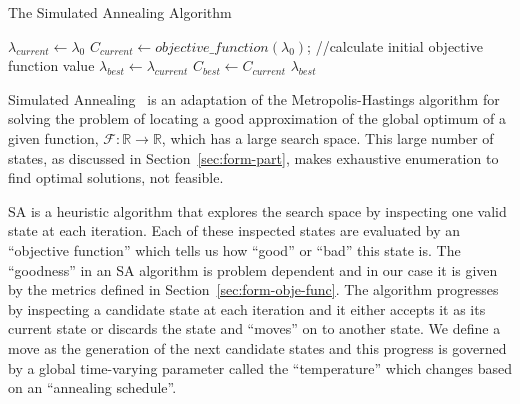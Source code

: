 \begin{algorithm}[ht!]
    \caption{The Simulated Annealing Algorithm}
    \label{algo:SA}
    $\lambda_{current} \leftarrow \lambda_0$ \;
    $C_{current} \leftarrow objective\_function(\lambda_0)$;  //calculate initial objective function value\;
    $\lambda_{best} \leftarrow \lambda_{current}$\;
    $C_{best} \leftarrow C_{current}$\;
    \Return $\lambda_{best}$
\end{algorithm}

Simulated Annealing~\cite{kirkpatrick1983optimization} is an adaptation of the Metropolis-Hastings algorithm for solving the problem of locating a good approximation of the global optimum of a given
function, $\mathcal{F}: \mathbb{R} \rightarrow \mathbb{R}$, which has a
large search space. This large number of states, as discussed in Section~\ref{sec:form-part}, makes exhaustive enumeration to find optimal solutions, not feasible.

SA is a heuristic algorithm that explores the search space by inspecting one valid state at each iteration. Each of these inspected states are evaluated by an ``objective function'' which tells us how ``good'' or ``bad'' this state is. The ``goodness'' in an SA algorithm is problem dependent and in our case it is given by the metrics defined in Section~\ref{sec:form-obje-func}. The algorithm progresses by inspecting a candidate state at each iteration and it either accepts it as its current state or discards the state and ``moves'' on to another state. We define a move as the generation of the next candidate states and this progress is governed by a global time-varying parameter called the ``temperature'' which changes based on an ``annealing schedule''.

